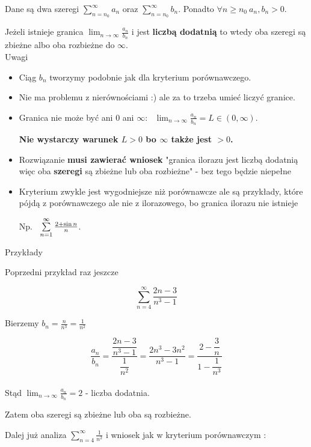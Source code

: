 Dane są dwa szeregi $ \sum\limits_{n = n_0}^{\infty} a_n $ oraz $ \sum\limits_{n = n_0}^{\infty} b_n $.
Ponadto $ \forall n \geq n_0 \ a_n, b_n > 0 $.

Jeżeli istnieje granica $ \lim_{n \to \infty} \frac{a_n}{b_n} $ i jest \textbf{liczbą dodatnią} to wtedy oba
szeregi są zbieżne albo oba rozbieżne do $\infty$. \\

Uwagi

\begin{itemize}
    \item Ciąg $b_n$ tworzymy podobnie jak dla kryterium porównawczego.
    \item Nie ma problemu z nierównościami :) ale za to trzeba umieć liczyć granice.
    \item Granica nie może być ani 0 ani $\infty$: \ $ \lim_{n \to \infty} \frac{a_n}{b_n} = L \in (0, \infty) $.
    
    \textbf{Nie wystarczy warunek $L > 0$ bo $\infty$ także jest $ > 0$.}
    \item Rozwiązanie \textbf{musi zawierać wniosek} "granica ilorazu jest liczbą dodatnią więc oba
    \textbf{szeregi} są zbieżne lub oba rozbieżne" - bez tego będzie niepełne
    
    \item Kryterium zwykle jest wygodniejsze niż porównawcze ale są przykłady, które pójdą z porównawczego ale nie z
    ilorazowego, bo granica ilorazu nie istnieje
    
    Np. \ $ \sum\limits_{n = 1}^{\infty} \frac{2 + \sin n}{n} $.
\end{itemize}

Przykłady

Poprzedni przykład raz jeszcze 

$$ \sum\limits_{n = 4}^{\infty} \frac{2n - 3}{n^3 - 1} $$

Bierzemy $ b_n = \frac{n}{n^3} = \frac{1}{n^2} $

$$ \dfrac{a_n}{b_n} = \dfrac{\dfrac{2n - 3}{n^3 - 1}}{\dfrac{1}{n^2}} = \dfrac{2n^3 - 3n^2}{n^3 - 1}
= \dfrac{2 - \dfrac{3}{n}}{1 - \dfrac{1}{n^3}} $$ \\

Stąd $ \lim_{n \to \infty} \frac{a_n}{b_n} = 2 $ - liczba dodatnia.

Zatem oba szeregi są zbieżne lub oba są rozbieżne.

Dalej już analiza $ \sum\limits_{n = 4}^{\infty} \frac{1}{n^2} $ i wniosek jak w kryterium porównawczym :

